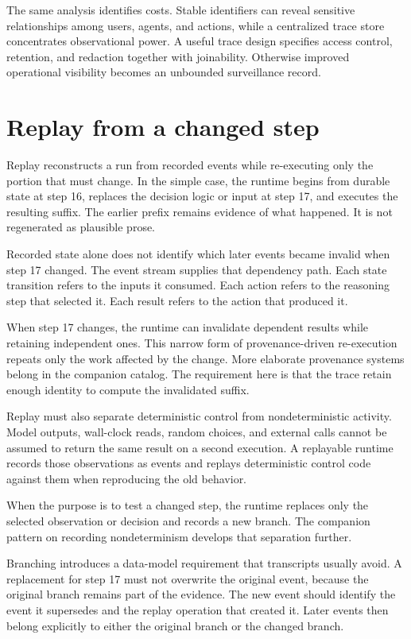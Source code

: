 The same analysis identifies costs. Stable identifiers can reveal sensitive relationships among users, agents, and actions, while a centralized trace store concentrates observational power. A useful trace design specifies access control, retention, and redaction together with joinability. Otherwise improved operational visibility becomes an unbounded surveillance record.

\hypertarget{replay-from-a-changed-step}{%
\section{Replay from a changed step}\label{replay-from-a-changed-step}}

Replay reconstructs a run from recorded events while re-executing only the portion that must change. In the simple case, the runtime begins from durable state at step 16, replaces the decision logic or input at step 17, and executes the resulting suffix. The earlier prefix remains evidence of what happened. It is not regenerated as plausible prose.

Recorded state alone does not identify which later events became invalid when step 17 changed. The event stream supplies that dependency path. Each state transition refers to the inputs it consumed. Each action refers to the reasoning step that selected it. Each result refers to the action that produced it.

When step 17 changes, the runtime can invalidate dependent results while retaining independent ones. This narrow form of provenance-driven re-execution repeats only the work affected by the change. More elaborate provenance systems belong in the companion catalog. The requirement here is that the trace retain enough identity to compute the invalidated suffix.

Replay must also separate deterministic control from nondeterministic activity. Model outputs, wall-clock reads, random choices, and external calls cannot be assumed to return the same result on a second execution. A replayable runtime records those observations as events and replays deterministic control code against them when reproducing the old behavior.

When the purpose is to test a changed step, the runtime replaces only the selected observation or decision and records a new branch. The companion pattern on recording nondeterminism develops that separation further.

Branching introduces a data-model requirement that transcripts usually avoid. A replacement for step 17 must not overwrite the original event, because the original branch remains part of the evidence. The new event should identify the event it supersedes and the replay operation that created it. Later events then belong explicitly to either the original branch or the changed branch.

